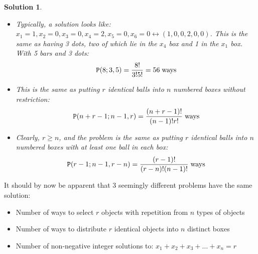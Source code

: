 \documentclass[12pt, letterpaper, onecolumn, conference, final]{IEEEtran}
\theoremstyle{definition}
\theoremstyle{plain}
\newtheorem{solution}{Solution}[section]
\begin{document}
\newpage
\begin{solution}
\hfill
\begin{itemize}

\item[(a)]
Typically, a solution looks like: $x_1=1, x_2=0, x_3=0, x_4=2, x_5=0, x_6=0 \leftrightarrow (1,0,0,2,0,0)$. This is the same as having 3 dots, two of which lie in the $x_4$ box and 1 in the $x_1$ box. With 5 bars and 3 dots:
\begin{equation*}
\mathtt{P}(8;3,5) = \frac{8!}{3!5!} = 56 \hspace{.1cm} \text{ways}
\end{equation*}

\vspace{.2cm}
\item[(b)]
This is the same as putting $r$ identical balls into $n$ numbered boxes without restriction:
\begin{equation*}
\mathtt{P}(n+r-1;n-1,r) = \frac{(n+r-1)!}{(n-1)!r!} \hspace{.1cm} \text{ways}
\end{equation*}

\vspace{.2cm}
\item[(c)]
Clearly, $r \geq n$, and the problem is the same as putting $r$ identical balls into $n$ numbered boxes with at least one ball in each box:
\begin{equation*}
\mathtt{P}(r-1;n-1,r-n) = \frac{(r-1)!}{(r-n)!(n-1)!} \hspace{.1cm} \text{ways}
\end{equation*}

\end{itemize}
\end{solution}

\vspace{.2cm}
\noindent
It should by now be apparent that 3 seemingly different problems have the same solution:
\begin{itemize}

\vspace{.2cm}
\item[(1)]
Number of ways to select $r$ objects with repetition from $n$ types of objects

\vspace{.2cm}
\item[(2)]
Number of ways to distribute $r$ identical objects into $n$ distinct boxes

\vspace{.2cm}
\item[(3)]
Number of non-negative integer solutions to: $x_1 + x_2 + x_3 + \dots + x_n = r$

\end{itemize}
\end{document}
